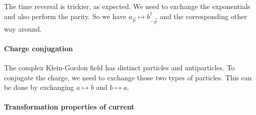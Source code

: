 \documentclass[11pt, english, fleqn, DIV=15, headinclude, BCOR=1cm]{scrartcl}
\begin{document}
The time reversal is trickier, as expected. We need to exchange the
exponentials and also perform the parity. So we have $a_{\vec
p} \mapsto b^\dagger_{- \vec p}$ and the corresponding other way around.

\paragraph{Charge conjugation}

The complex Klein-Gordon field has distinct particles and antiparticles. To
conjugate the charge, we need to exchange those two types of particles. This
can be done by exchanging $a \mapsto b$ and $b \mapsto a$.

\paragraph{Transformation properties of current}
\end{document}
